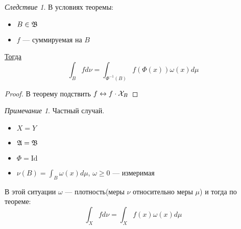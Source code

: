 \documentclass[english]{article}
\theoremstyle{plain}
\theoremstyle{remark}
\newtheorem*{remark}{Примечание}
\newtheorem{corollary}{Следствие}[theorem]
\theoremstyle{definition}
\begin{document}
\begin{corollary}
В условиях теоремы:
\begin{itemize}
\item \(B \in \mathfrak{B}\)
\item \(f\) --- суммируемая на \(B\)
\end{itemize}
\uline{Тогда} \[ \int_B f d\nu = \int_{\Phi^{-1}(B)}f(\Phi(x))\omega(x)d\mu\]
\end{corollary}
\begin{proof}
В теорему подствить \(f \leftrightarrow f\cdot\mathcal{X}_{B}\)
\end{proof}
\begin{remark}
Частный случай.
\begin{itemize}
\item \(X = Y\)
\item \(\mathfrak{A} = \mathfrak{B}\)
\item \(\Phi = \text{Id}\)
\item \(\nu(B) = \int_B\omega(x)d\mu\), \(\omega \ge 0\) --- измеримая
\end{itemize}
В этой ситуации \(\omega\) --- плотность(меры \(\nu\) относительно меры \(\mu\)) и тогда по теореме:
\[ \int_X f d\nu = \int_X f(x)\omega(x)d\mu \]
\end{remark}
\end{document}
